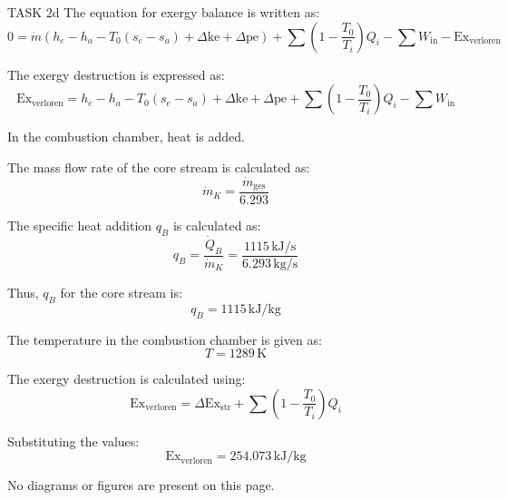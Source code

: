 TASK 2d  
The equation for exergy balance is written as:  
\[
0 = \dot{m} (h_e - h_a - T_0 (s_e - s_a) + \Delta \text{ke} + \Delta \text{pe}) + \sum \left( 1 - \frac{T_0}{T_i} \right) Q_i - \sum W_{\text{in}} - \text{Ex}_{\text{verloren}}
\]  

The exergy destruction is expressed as:  
\[
\text{Ex}_{\text{verloren}} = h_e - h_a - T_0 (s_e - s_a) + \Delta \text{ke} + \Delta \text{pe} + \sum \left( 1 - \frac{T_0}{T_i} \right) Q_i - \sum W_{\text{in}}
\]  

In the combustion chamber, heat is added.  

The mass flow rate of the core stream is calculated as:  
\[
\dot{m}_K = \frac{\dot{m}_{\text{ges}}}{6.293}
\]  

The specific heat addition \( q_B \) is calculated as:  
\[
q_B = \frac{\dot{Q}_B}{\dot{m}_K} = \frac{1115 \, \text{kJ/s}}{6.293 \, \text{kg/s}}
\]  

Thus, \( q_B \) for the core stream is:  
\[
q_B = 1115 \, \text{kJ/kg}
\]  

The temperature in the combustion chamber is given as:  
\[
T = 1289 \, \text{K}
\]  

The exergy destruction is calculated using:  
\[
\text{Ex}_{\text{verloren}} = \Delta \text{Ex}_{\text{str}} + \sum \left( 1 - \frac{T_0}{T_i} \right) Q_i
\]  

Substituting the values:  
\[
\text{Ex}_{\text{verloren}} = 254.073 \, \text{kJ/kg}
\]  

No diagrams or figures are present on this page.
